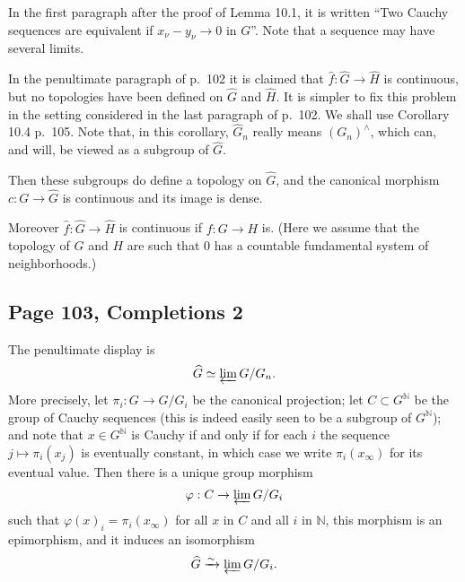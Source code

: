 \documentclass[parskip=half,fontsize=12pt]{scrartcl}%
\begin{document}
In the first paragraph after the proof of Lemma 10.1, it is written ``Two Cauchy sequences are equivalent if $x_\nu-y_\nu\to0$ in $G$''. Note that a sequence may have several limits.%

In the penultimate paragraph of p.~102 it is claimed that $\widehat f:\widehat G\to\widehat H$ is continuous, but no topologies have been defined on $\widehat G$ and $\widehat H$. It is simpler to fix this problem in the setting considered in the last paragraph of p.~102. We shall use Corollary 10.4 p.~105. Note that, in this corollary, $\widehat G_n$ really means $(G_n)^\wedge$, which can, and will, be viewed as a subgroup of $\widehat G$. 

Then these subgroups do define a topology on $\widehat G$, and the canonical morphism $c:G\to\widehat G$ is continuous and its image is dense. 

Moreover $\widehat f:\widehat G\to\widehat H$ is continuous if $f:G\to H$ is. (Here we assume that the topology of $G$ and $H$ are such that $0$ has a countable fundamental system of neighborhoods.)


\subsection{Page 103, Completions 2}%

The penultimate display is 
$$
\widehat G\simeq\varprojlim G/G_n.
$$ 
More precisely, let $\pi_i:G\to G/G_i$ be the canonical projection; let $C\subset G^{\mathbb N}$ be the group of Cauchy sequences (this is indeed easily seen to be a subgroup of $G^{\mathbb N}$); and note that $x\in G^{\mathbb N}$ is Cauchy if and only if for each $i$ the sequence $j\mapsto\pi_i(x_j)$ is eventually constant, in which case we write $\pi_i(x_\infty)$ for its eventual value. Then there is a unique group morphism 
$$
\varphi:C\to\varprojlim G/G_i
$$ 
such that $\varphi(x)_i=\pi_i(x_\infty)$ for all $x$ in $C$ and all $i$ in $\mathbb N$, this morphism is an epimorphism, and it induces an isomorphism 
$$
\widehat G\xrightarrow\sim\varprojlim G/G_i.
$$ %
\end{document}
